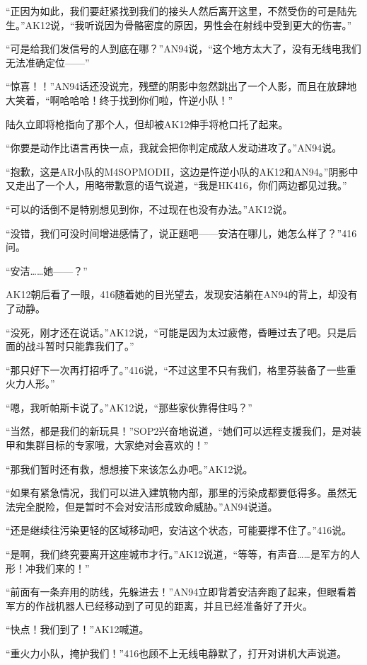 “正因为如此，我们要赶紧找到我们的接头人然后离开这里，不然受伤的可是陆先生。”AK12说，“我听说因为骨骼密度的原因，男性会在射线中受到更大的伤害。”

“可是给我们发信号的人到底在哪？”AN94说，“这个地方太大了，没有无线电我们无法准确定位——”

“惊喜！！”AN94话还没说完，残壁的阴影中忽然跳出了一个人影，而且在放肆地大笑着，“啊哈哈哈！终于找到你们啦，忤逆小队！”

陆久立即将枪指向了那个人，但却被AK12伸手将枪口托了起来。

“你要是动作比语言再快一点，我就会把你判定成敌人发动进攻了。”AN94说。

“抱歉，这是AR小队的M4SOPMODII，这边是忤逆小队的AK12和AN94。”阴影中又走出了一个人，用略带歉意的语气说道，“我是HK416，你们两边都见过我。”

“可以的话倒不是特别想见到你，不过现在也没有办法。”AK12说。

“没错，我们可没时间增进感情了，说正题吧——安洁在哪儿，她怎么样了？”416问。

“安洁……她——？”

AK12朝后看了一眼，416随着她的目光望去，发现安洁躺在AN94的背上，却没有了动静。

“没死，刚才还在说话。”AK12说，“可能是因为太过疲倦，昏睡过去了吧。只是后面的战斗暂时只能靠我们了。”

“那只好下一次再打招呼了。”416说，“不过这里不只有我们，格里芬装备了一些重火力人形。”

“嗯，我听帕斯卡说了。”AK12说，“那些家伙靠得住吗？”

“当然，都是我们的新玩具！”SOP2兴奋地说道，“她们可以远程支援我们，是对装甲和集群目标的专家哦，大家绝对会喜欢的！”

“那我们暂时还有救，想想接下来该怎么办吧。”AK12说。

“如果有紧急情况，我们可以进入建筑物内部，那里的污染成都要低得多。虽然无法完全脱险，但是暂时不会对安洁形成致命威胁。”AN94说道。

“还是继续往污染更轻的区域移动吧，安洁这个状态，可能要撑不住了。”416说。

“是啊，我们终究要离开这座城市才行。”AK12说道，“等等，有声音……是军方的人形！冲我们来的！”

“前面有一条弃用的防线，先躲进去！”AN94立即背着安洁奔跑了起来，但眼看着军方的作战机器人已经移动到了可见的距离，并且已经准备好了开火。

“快点！我们到了！”AK12喊道。

“重火力小队，掩护我们！”416也顾不上无线电静默了，打开对讲机大声说道。

